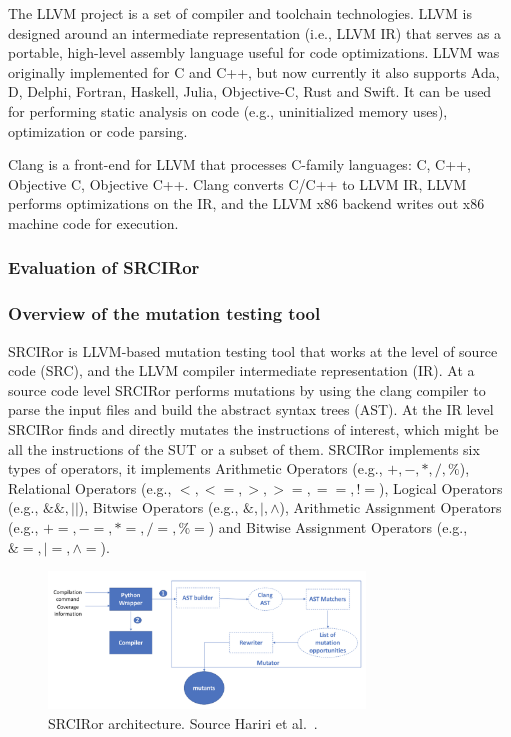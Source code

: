 The LLVM project is a set of compiler and toolchain technologies. LLVM is designed around an intermediate representation (i.e., LLVM IR) that serves as a portable, high-level assembly language useful for code optimizations. LLVM was originally implemented for C and C++, but now currently it also supports Ada, D, Delphi, Fortran, Haskell, Julia, Objective-C, Rust and Swift. It can be used for performing static analysis on code (e.g., uninitialized memory uses), optimization or code parsing.

Clang is a front-end for LLVM that processes C-family languages: C, C++, Objective C, Objective C++. Clang converts C/C++ to LLVM IR, LLVM performs optimizations on the IR, and the LLVM x86 backend writes out x86 machine code for execution.

\subsubsection{Evaluation of SRCIRor}
\label{subsec:srciror}

\subsubsection{Overview of the mutation testing tool}

SRCIRor is LLVM-based mutation testing tool that works at the level of source code (SRC), and the LLVM compiler intermediate representation (IR). 
At a source code level SRCIRor performs mutations by using the clang compiler to parse the input files and build the abstract syntax trees (AST). 
At the IR level SRCIRor finds and directly mutates the instructions of interest, which might be all the instructions of the SUT or a subset of them. 
SRCIRor implements six types of operators, it implements Arithmetic Operators (e.g., $+, -, *, /, \%$), Relational Operators (e.g., $<, <=, >, >=, ==, !=$), Logical Operators (e.g., $\&\&, ||$), Bitwise Operators (e.g., $\&, |, \wedge$), Arithmetic Assignment Operators (e.g., $+=, -=, *=, /=, \%=$) and Bitwise Assignment Operators (e.g., $\&=, |=, \wedge=$).

\begin{figure}[h]
	\centering
    \includegraphics[width=0.75\textwidth]{images/srciror_arch}
    \caption{SRCIRor architecture. Source Hariri et al.~\cite{hariri2018srciror}.}
    \label{fig:srciror_arch}
\end{figure}

